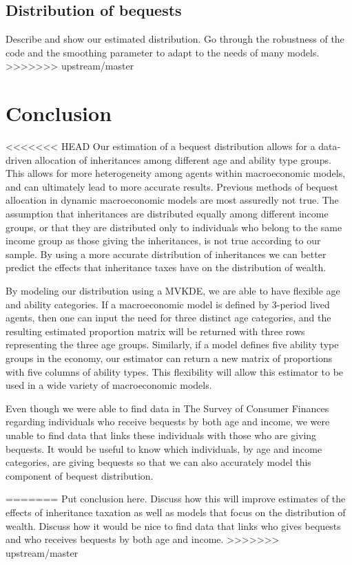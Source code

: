 \documentclass[letterpaper,12pt]{article}
\theoremstyle{definition}
\begin{document}
\begin{spacing}{1.5}
  \subsection{Distribution of bequests}\label{SecDistEst}

    Describe and show our estimated distribution. Go through the robustness of the code and the smoothing parameter to adapt to the needs of many models.
>>>>>>> upstream/master


\section{Conclusion}\label{SecConclusion}

<<<<<<< HEAD
Our estimation of a bequest distribution allows for a data-driven allocation of inheritances among different age and ability type groups. This allows for more heterogeneity among agents within macroeconomic models, and can ultimately lead to more accurate results. Previous methods of bequest allocation in dynamic macroeconomic models are most assuredly not true. The assumption that inheritances are distributed equally among different income groups, or that they are distributed only to individuals who belong to the same income group as those giving the inheritances, is not true according to our sample. By using a more accurate distribution of inheritances we can better predict the effects that inheritance taxes have on the distribution of wealth.

By modeling our distribution using a MVKDE, we are able to have flexible age and ability categories. If a macroeconomic model is defined by 3-period lived agents, then one can input the need for three distinct age categories, and the resulting estimated proportion matrix will be returned with three rows representing the three age groups. Similarly, if a model defines five ability type groups in the economy, our estimator can return a new matrix of proportions with five columns of ability types. This flexibility will allow this estimator to be used in a wide variety of macroeconomic models.

Even though we were able to find data in The Survey of Consumer Finances regarding individuals who receive bequests by both age and income, we were unable to find data that links these individuals with those who are giving bequests. It would be useful to know which individuals, by age and income categories, are giving bequests so that we can also accurately model this component of bequest distribution.


=======
  Put conclusion here. Discuss how this will improve estimates of the effects of inheritance taxation as well as models that focus on the distribution of wealth. Discuss how it would be nice to find data that links who gives bequests and who receives bequests by both age and income.
>>>>>>> upstream/master

\clearpage


\end{spacing}
\end{document}
